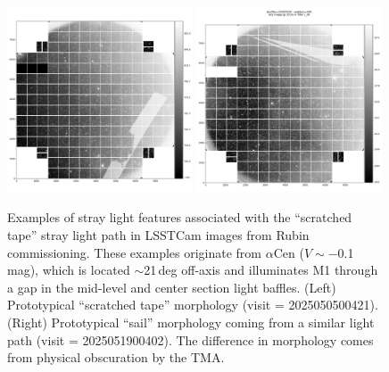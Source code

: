 \documentclass[SE,authoryear,toc]{lsstdoc}
\begin{document}
\begin{figure}[t!]
    \includegraphics[width=0.49\textwidth]{figures/lsstcam_focal_plane_mosaic_2025-05-05_000421.jpg}
    \includegraphics[width=0.49\textwidth, clip, trim={0.5cm 0 0 0}]{figures/lsstcam_focal_plane_mosaic_2025-05-19_000402.jpg}
    \caption{\label{fig:tape} Examples of stray light features associated with the ``scratched tape'' stray light path in LSSTCam images from Rubin commissioning. These examples originate from $\alpha$Cen ($V \sim -$0.1\,mag), which is located $\sim$21\,deg off-axis and illuminates M1 through a gap in the mid-level and center section light baffles. (Left) Prototypical ``scratched tape'' morphology (visit = 2025050500421). (Right) Prototypical ``sail'' morphology coming from a similar light path (visit = 2025051900402). The difference in morphology comes from physical obscuration by the TMA.}
\end{figure}
\end{document}
